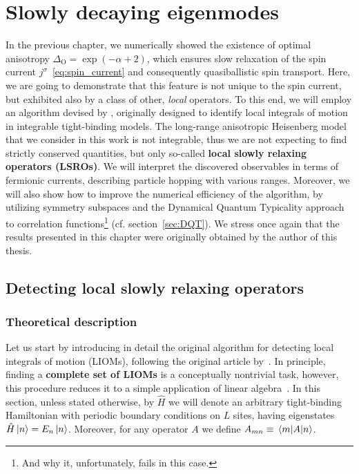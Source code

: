 \chapter{Slowly decaying eigenmodes\label{chap:currents}}
\thispagestyle{chapterBeginStyle}

In the previous chapter, we numerically showed the existence of optimal anisotropy
\(\Delta_{\mathrm{O}} = \exp(- \alpha + 2)\), which ensures slow relaxation of the spin current
\(j^{\sigma}\)~\eqref{eq:spin_current} and consequently quasiballistic spin transport.
Here, we are going to demonstrate that this feature is not unique to the spin current, but
exhibited also by a class of other, \textit{local} operators. To this end, we will
employ an algorithm devised by \textcite{Mierzejewski2015a}, originally designed to
identify local integrals of motion in integrable tight-binding models.
The long-range anisotropic Heisenberg model that we consider in this work is not integrable,
thus we are not expecting to find strictly conserved quantities,
but only so-called \textbf{local slowly relaxing operators (LSROs)}.
We will interpret the discovered observables in terms of
fermionic currents, describing particle hopping with various ranges.
Moreover, we will also show how to improve the numerical efficiency of
the algorithm, by utilizing symmetry subspaces and the Dynamical Quantum Typicality
approach to correlation functions\footnote{And why it, unfortunately, fails in this case.}
(cf. section~\ref{sec:DQT}). We stress once again that the results presented in this
chapter were originally obtained by the author of this thesis.

\section{Detecting local slowly relaxing operators \label{sec:slowly_relaxing_operators}}
\subsection{Theoretical description}
Let us start by introducing in detail the original algorithm for detecting local integrals
of motion (LIOMs), following the original article by~\textcite{Mierzejewski2015a}.
In principle, finding a \textbf{complete set of LIOMs} is a conceptually
nontrivial task, however, this procedure reduces it to a simple application of linear algebra~\autocite{Mierzejewski2015a}.
In this section, unless stated otherwise, by \(\hat{H} \) we will denote an arbitrary
tight-binding Hamiltonian with periodic boundary conditions
on \(L\) sites, having eigenstates \(\hat{H}  \ket{n} = E_{n} \ket{n}\). Moreover,
for any operator \(A\) we define \(A_{mn} \equiv \matrixel{m}{A}{n}\).

